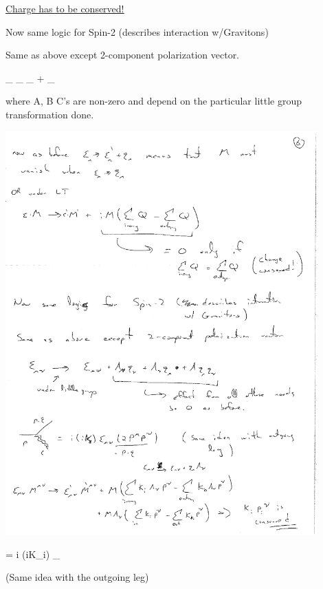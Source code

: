 {\underline{\underline{Charge has to be conserved! }}

\lineacross

Now same logic for Spin-2  (describes interaction w/Gravitons)

Same as above except 2-component polarization vector.


\be
\epsilon_{\mu\nu} \underbrace{\rightarrow}_{} \epsilon_{\mu\nu} + _{}
\ee

where A, B C's are non-zero and depend on the particular little group transformation done.


\begin{minipage}{0.4\textwidth}
\includegraphics[width=0.9\textwidth]{./gravitonVertex.pdf}
\end{minipage} %
\begin{minipage}{0.45\textwidth}
\be
= i (iK_i) \epsilon_{\mu\nu} 
\ee
\end{minipage} %

(Same idea with the outgoing leg)


}
